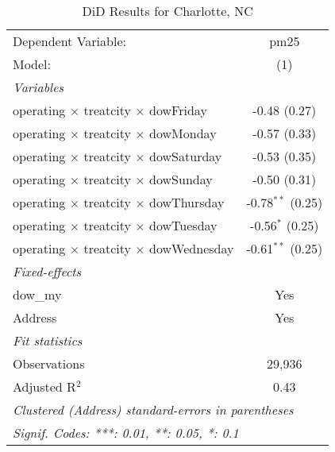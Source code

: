 
\begin{table}[htbp]
   \caption{DiD Results for Charlotte, NC}
   \centering
   \begin{tabular}{lc}
      \tabularnewline \midrule \midrule
      Dependent Variable:                                  & pm25\\  
      Model:                                               & (1)\\  
      \midrule
      \emph{Variables}\\
      operating $\times$ treatcity $\times$ dowFriday      & -0.48 (0.27)\\   
      operating $\times$ treatcity $\times$ dowMonday      & -0.57 (0.33)\\   
      operating $\times$ treatcity $\times$ dowSaturday    & -0.53 (0.35)\\   
      operating $\times$ treatcity $\times$ dowSunday      & -0.50 (0.31)\\   
      operating $\times$ treatcity $\times$ dowThursday    & -0.78$^{**}$ (0.25)\\   
      operating $\times$ treatcity $\times$ dowTuesday     & -0.56$^{*}$ (0.25)\\   
      operating $\times$ treatcity $\times$ dowWednesday   & -0.61$^{**}$ (0.25)\\   
      \midrule
      \emph{Fixed-effects}\\
      dow\_my                                              & Yes\\  
      Address                                              & Yes\\  
      \midrule
      \emph{Fit statistics}\\
      Observations                                         & 29,936\\  
      Adjusted R$^2$                                       & 0.43\\  
      \midrule \midrule
      \multicolumn{2}{l}{\emph{Clustered (Address) standard-errors in parentheses}}\\
      \multicolumn{2}{l}{\emph{Signif. Codes: ***: 0.01, **: 0.05, *: 0.1}}\\
   \end{tabular}
\end{table}


